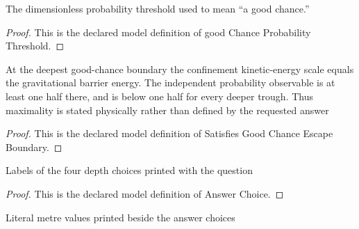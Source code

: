\begin{definition}
  \label{def:physics:phyx-mini-0654:phyxminiproblems-problemphyxmini0654-goodchanceprobabilitythreshold}
  The dimensionless probability threshold used to mean “a good chance.”
\end{definition}
\begin{proof}
  This is the declared model definition of good Chance Probability Threshold.
\end{proof}
\begin{definition}
  \label{def:physics:phyx-mini-0654:phyxminiproblems-problemphyxmini0654-satisfiesgoodchanceescapeboundary}
  At the deepest good-chance boundary the confinement kinetic-energy scale equals the gravitational barrier energy. The independent probability observable is at least one half there, and is below one half for every deeper trough. Thus maximality is stated physically rather than defined by the requested answer
\end{definition}
\begin{proof}
  This is the declared model definition of Satisfies Good Chance Escape Boundary.
\end{proof}
\begin{definition}
  \label{def:physics:phyx-mini-0654:phyxminiproblems-problemphyxmini0654-answerchoice}
  Labels of the four depth choices printed with the question
\end{definition}
\begin{proof}
  This is the declared model definition of Answer Choice.
\end{proof}
\begin{definition}
  \label{def:physics:phyx-mini-0654:phyxminiproblems-problemphyxmini0654-displayeddepthinmeters}
  Literal metre values printed beside the answer choices
\end{definition}
